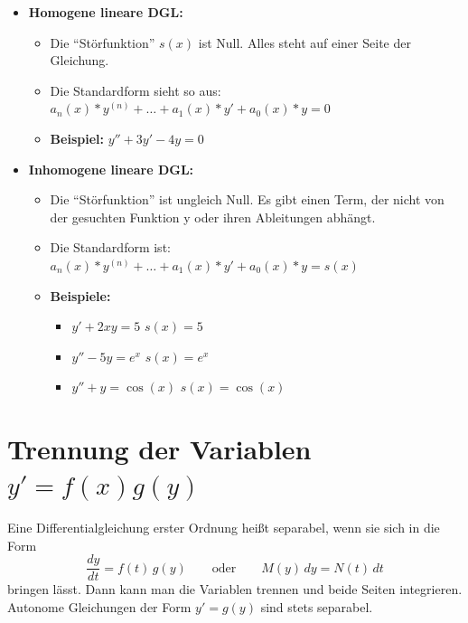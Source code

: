 \documentclass[a4paper,11pt,oneside,open=any,parskip=half, DIV=15]{scrreprt}
\begin{document}
      \begin{itemize}
         \item \textbf{Homogene lineare DGL:}
         \begin{itemize}
            \item Die ``Störfunktion'' \(s(x)\) ist Null. Alles steht auf einer Seite der Gleichung.
            \item Die Standardform sieht so aus: \(a_n(x)*y^{(n)} + \ldots + a_1(x)*y' + a_0(x)*y = 0\)  %
            \item \textbf{Beispiel:} \(y'' + 3y' - 4y = 0\)
         \end{itemize}
         
         \item \textbf{Inhomogene lineare DGL:}
         \begin{itemize}
            \item Die ``Störfunktion'' ist ungleich Null. Es gibt einen Term, der nicht von der gesuchten Funktion y oder ihren Ableitungen abhängt.
            \item Die Standardform ist: \(a_n(x)*y^{(n)} + \ldots + a_1(x)*y' + a_0(x)*y = s(x)\)  %
            \item \textbf{Beispiele:}
            \begin{itemize}
                  \item \(y' + 2xy = 5\) \; \(s(x) = 5\)
                  \item \(y'' - 5y = e^x\) \; \(s(x) = e^x\)
                  \item \(y'' + y = \cos(x)\) \; \(s(x) = \cos(x)\)
            \end{itemize}
         \end{itemize}
      \end{itemize}

\section[Trennung der Variablen y' = f(t)g(y)]{Trennung der Variablen \texorpdfstring{$y' = f(x)g(y)$}{y' = f(x)g(y)}}

   Eine Differentialgleichung erster Ordnung heißt separabel, wenn sie sich in die Form
   \[
      \frac{dy}{dt}=f(t)\,g(y)
      \qquad\text{oder}\qquad
      M(y)\,dy=N(t)\,dt
   \]
   bringen lässt. Dann kann man die Variablen trennen und beide Seiten integrieren.
   Autonome Gleichungen der Form \(y'=g(y)\) sind stets separabel.
\end{document}
